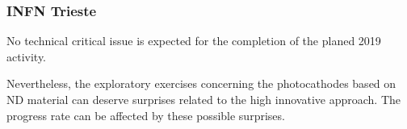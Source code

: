 \subsubsection{INFN Trieste} 
No technical critical issue is expected 
for the completion of the
planed 2019 activity.
\par
Nevertheless, the exploratory exercises concerning the
photocathodes based on ND material can deserve surprises
related to the high innovative approach. The progress rate 
can be affected by these possible surprises.